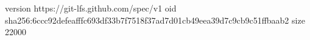 version https://git-lfs.github.com/spec/v1
oid sha256:6ccc92defeafffc693df33b7f7518f37ad7d01cb49eea39d7c9cb9c51ffbaab2
size 22000
